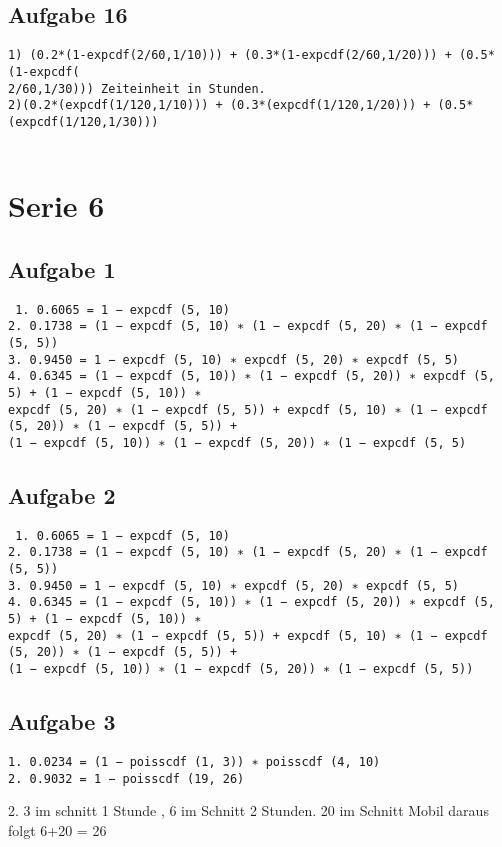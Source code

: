 \documentclass[a4paper,10pt]{scrbook}
\begin{document}
\section*{Aufgabe 16}
\begin{verbatim}
1) (0.2*(1-expcdf(2/60,1/10))) + (0.3*(1-expcdf(2/60,1/20))) + (0.5*(1-expcdf(
2/60,1/30))) Zeiteinheit in Stunden.
2)(0.2*(expcdf(1/120,1/10))) + (0.3*(expcdf(1/120,1/20))) + (0.5*(expcdf(1/120,1/30)))
 
\end{verbatim}

\chapter*{Serie 6}
\section*{Aufgabe 1}
\begin{verbatim}
 1. 0.6065 = 1 − expcdf (5, 10)
2. 0.1738 = (1 − expcdf (5, 10) ∗ (1 − expcdf (5, 20) ∗ (1 − expcdf (5, 5))
3. 0.9450 = 1 − expcdf (5, 10) ∗ expcdf (5, 20) ∗ expcdf (5, 5)
4. 0.6345 = (1 − expcdf (5, 10)) ∗ (1 − expcdf (5, 20)) ∗ expcdf (5, 5) + (1 − expcdf (5, 10)) ∗
expcdf (5, 20) ∗ (1 − expcdf (5, 5)) + expcdf (5, 10) ∗ (1 − expcdf (5, 20)) ∗ (1 − expcdf (5, 5)) +
(1 − expcdf (5, 10)) ∗ (1 − expcdf (5, 20)) ∗ (1 − expcdf (5, 5)
\end{verbatim}
\section*{Aufgabe 2}
\begin{verbatim}
 1. 0.6065 = 1 − expcdf (5, 10)
2. 0.1738 = (1 − expcdf (5, 10) ∗ (1 − expcdf (5, 20) ∗ (1 − expcdf (5, 5))
3. 0.9450 = 1 − expcdf (5, 10) ∗ expcdf (5, 20) ∗ expcdf (5, 5)
4. 0.6345 = (1 − expcdf (5, 10)) ∗ (1 − expcdf (5, 20)) ∗ expcdf (5, 5) + (1 − expcdf (5, 10)) ∗
expcdf (5, 20) ∗ (1 − expcdf (5, 5)) + expcdf (5, 10) ∗ (1 − expcdf (5, 20)) ∗ (1 − expcdf (5, 5)) +
(1 − expcdf (5, 10)) ∗ (1 − expcdf (5, 20)) ∗ (1 − expcdf (5, 5))
\end{verbatim}

\section*{Aufgabe 3}
\begin{verbatim}
1. 0.0234 = (1 − poisscdf (1, 3)) ∗ poisscdf (4, 10)
2. 0.9032 = 1 − poisscdf (19, 26)
\end{verbatim}
2. 3 im schnitt 1 Stunde , 6 im Schnitt 2 Stunden. 20 im Schnitt Mobil daraus folgt 6+20 = 26
\end{document}
